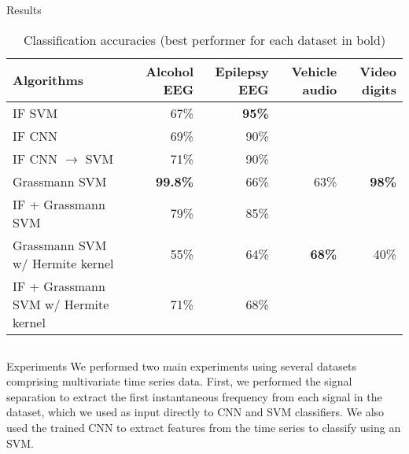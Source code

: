 \documentclass[final]{beamer}
\newlength{\onecolwid}
\newlength{\twocolwid}
\begin{document}
\begin{frame}[t]
\begin{columns}[t]
\begin{column}{\twocolwid}

\begin{block}{Results}
    \begin{table}
        \begin{tabular}{l r r r r}
            \toprule
            \textbf{Algorithms} & Alcohol EEG & Epilepsy EEG & Vehicle audio & Video digits \\
            \midrule
            IF SVM & 67\% & \textbf{95\%} & & \\
            IF CNN & 69\% & 90\% & & \\
            IF CNN $\rightarrow$ SVM & 71\% & 90\% & & \\
            Grassmann SVM & \textbf{99.8\%} & 66\% & 63\% & \textbf{98\%} \\
            IF + Grassmann SVM & 79\% & 85\% \\
            Grassmann SVM w/ Hermite kernel & 55\% & 64\% & \textbf{68\%} & 40\% \\
            IF + Grassmann SVM  w/ Hermite kernel & 71\% & 68\% & & \\
            \bottomrule
        \end{tabular}
        \caption{Classification accuracies (best performer for each dataset in bold)}
        \label{results}
    \end{table}
\end{block}


\begin{columns}[t,totalwidth=\twocolwid] %

\begin{column}{\onecolwid}\vspace{-.6in} %


\begin{block}{Experiments}
    We performed two main experiments using several datasets comprising multivariate time series
    data. First, we performed the signal separation to extract the first instantaneous frequency
    from each signal in the dataset, which we used as input directly to CNN and SVM classifiers. We
    also used the trained CNN to extract features from the time series to classify using an SVM.


\end{block}
\end{column}
\end{columns}
\end{column}
\end{columns}
\end{frame}
\end{document}

